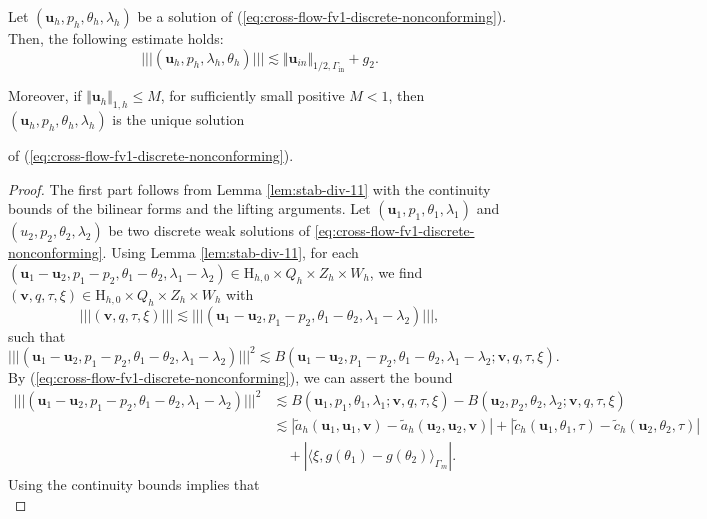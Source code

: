 \documentclass[onefignum,onetabnum,reqno,a4paper,final]{siamart250211}
\newcommand\bu{\boldsymbol{u}}
\newcommand\bv{\boldsymbol{v}}
\newcommand\0{\mathbf{0}}
\newcommand\bH{\boldsymbol{\mathrm{H}}}
\newcommand\Gi{\Gamma_{\mathrm{in}}}
\newcommand{\triplenorm}[1]{\lvert\!\lvert\!\lvert #1
  \rvert\!\rvert\!\rvert}
\numberwithin{figure}{section}
\numberwithin{table}{section}
\begin{document}
 \begin{theorem}
 {Let $(\bu_h,p_h,\theta_h,\lambda_h)$ be a solution of (\ref{eq:cross-flow-fv1-discrete-nonconforming}).  Then, the following estimate holds:
     \[\triplenorm{(\bu_h,p_h,\lambda_h,\theta_h)}\lesssim \Vert \bu_{in}\Vert_{1/2,\Gi}+g_2.\]
 
 Moreover, if 
      $\Vert\bu_h\Vert_{1,h}\le M$, for sufficiently small positive $M<1$, then
     $(\bu_h,p_h,\theta_h,\lambda_h)$ is the unique solution} 
     of (\ref{eq:cross-flow-fv1-discrete-nonconforming}).
    \end{theorem}
	\begin{proof}
    The first part  follows from Lemma \ref{lem:stab-div-11} with the continuity bounds of the bilinear forms and the lifting arguments.
   Let $(\bu_1,p_1,\theta_1,\lambda_1)$ and $(u_2,p_2,\theta_2,\lambda_2)$ be two discrete weak solutions of \eqref{eq:cross-flow-fv1-discrete-nonconforming}. Using Lemma \ref{lem:stab-div-11}, for each $({\bu}_1-\bu_2,{p}_1-p_2,{\theta}_1-\theta_2,{\lambda}_1-\lambda_2)\in {\bH_{h,0}}\times Q_h\times Z_h\times W_h $, we find $(\bv,q,\tau,\xi)\in {\bH_{h,0}}\times Q_h\times Z_h\times W_h$ with 
      \[\triplenorm{(\bv,q,\tau,\xi)}\lesssim\triplenorm{({\bu}_1-\bu_2,{p}_1-p_2,{\theta}_1-\theta_2,{\lambda}_1-\lambda_2)},\]
        such that
        $$
        \triplenorm{({\bu}_1-\bu_2,{p}_1-p_2,{\theta}_1-\theta_2,{\lambda}_1-\lambda_2)}^2\lesssim B({\bu}_1-\bu_2,{p}_1-p_2,{\theta}_1-\theta_2,{\lambda}_1-\lambda_2; \bv,q,\tau,\xi).
        $$
      By (\ref{eq:cross-flow-fv1-discrete-nonconforming}), we can assert the bound 
      \begin{align}\label{eq:lem-div-11}
       \triplenorm{({\bu}_1-\bu_2,{p}_1-p_2,{\theta}_1-\theta_2,{\lambda}_1-\lambda_2)}^2&\lesssim B({\bu}_1,{p}_1,{\theta}_1,{\lambda}_1; \bv,q,\tau,\xi)-B(\bu_2,p_2,\theta_2,\lambda_2; \bv,q,\tau,\xi)\nonumber\\
       &\lesssim|\widetilde{a}_h(\bu_1,\bu_1,\bv)-\widetilde{a}_h(\bu_2,\bu_2,\bv)|+|\widetilde{c}_h(\bu_1,\theta_1,\tau)-\widetilde{c}_h(\bu_2,\theta_2,\tau)|\nonumber\\
       &\quad+|\langle \xi, g(\theta_1)-g(\theta_2)\rangle_{\Gamma_m}|.
      \end{align}
      Using the continuity bounds implies that
      \begin{subequations}\label{eq:lem-div-12}

\end{subequations}
\end{proof}
\end{document}
